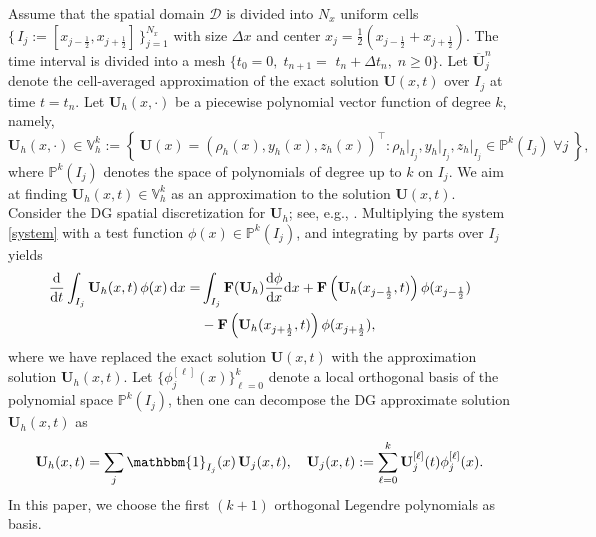 \documentclass[times,final]{elsarticle}
\numberwithin{equation}{section}
\theoremstyle{definition}
\theoremstyle{remark}
\newcommand{\BU}{\mathbf{U}}
\newcommand{\BF}{\mathbf{F}}
\begin{document}
Assume that the spatial domain $\mathcal{D}$ is divided into $N_x$ uniform cells $\big\{ \, I_j := [x_{j - \frac{1}{2}}, x_{j + \frac{1}{2}}] \, \big\}_{j=1}^{N_x}$ with size $\Delta x$ and center $x_j = \frac{1}{2} (x_{j - \frac{1}{2}} + x_{j + \frac{1}{2}})$. 
The time interval is divided into a mesh $\big\{ t_0 = 0, \; t_{n + 1} =$ $ t_n + \Delta t_n, \; n \geq 0\big\}$. 
Let $\overline{\BU}_j^n$ denote the cell-averaged approximation of the exact solution $\BU(x, t)$ over $I_j$ at time $t = t_n$. 
Let $\BU_h (x,\cdot)$ be a piecewise polynomial vector function of degree $k$, namely,
\begin{equation*}
	\BU_h (x,\cdot) \in \mathbb{V}_h^k := \left\{~ \BU(x) = (\rho_h(x), y_h(x), z_h(x))^\top: \rho_h \vert_{I_j}, y_h \vert_{I_j}, z_h \vert_{I_j} \in \mathbb{P}^k (I_j) \; \forall j ~\right\},
\end{equation*}
where $\mathbb{P}^k (I_j)$ denotes the space of polynomials of degree up to $k$ on $I_j$. 
We aim at finding $\BU_h(x,t) \in \mathbb{V}_h^k$ as an approximation to the solution $\BU(x,t)$. 
Consider the DG spatial discretization for $\BU_h$; see, e.g., \cite{cockburn2000development,cockburn1989tvb,cockburn1989tvbs,shu2009discontinuous}. 
Multiplying the system \eqref{system} with a test function $\phi(x) \in \mathbb{P}^k (I_j)$, and integrating by parts over $I_j$ yields
\begin{equation}\label{DG}
	\begin{aligned}
		\frac{\rm d}{{\rm d} t} \int_{I_j} \BU_h(x,t) \, \phi(x)  \, {\rm d} x 
		= &
		\int_{I_j} \BF (\BU_h) \frac{{\rm d} \phi}{{\rm d} x} {\rm d} x 
		+ 
		\BF \left(\BU_h (x_{j - \frac{1}{2}},t ) \right) \phi ( x_{j - \frac{1}{2}} ) 
		\\
		&
		- 
		\BF \left(\BU_h (x_{j + \frac{1}{2}},t ) \right) \phi ( x_{j + \frac{1}{2}} ),
	\end{aligned}
\end{equation} 
where we have replaced the exact solution $\BU(x,t)$ with the approximation solution $\BU_h(x,t)$.
Let $\big\{ \phi_j^{[\ell]}(x) \big\}_{\ell = 0}^k$ denote a local orthogonal basis of the polynomial space $\mathbb{P}^k (I_j)$, then one can decompose the DG approximate solution $\BU_h(x,t)$ as
\begin{equation}\label{basis}
	\BU_h (x,t) = \sum_{j} \mathbbm{1}_{I_j}(x) \, \BU_j (x, t),
	\quad
	\BU_j (x,t)
	:=
	\sum_{\ell = 0}^k \BU_j^{[\ell]} (t) \phi_j^{[\ell]} (x)
	.
\end{equation}
In this paper, we choose the first $(k+1)$ orthogonal Legendre polynomials as basis.
\end{document}
